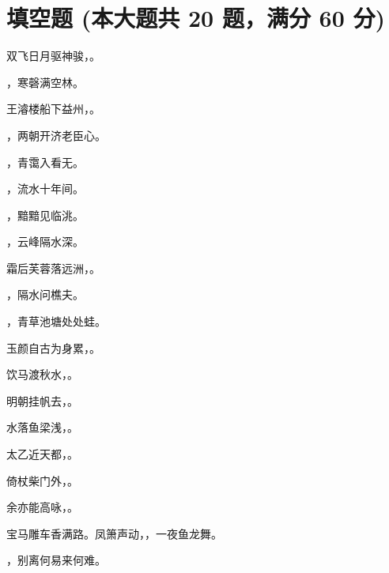 \documentclass[12pt, a4paper, addpoints, answers]{exam}
\begin{document}
\pagestyle{headandfoot}

\begin{center}
\end{center}
\vspace{5mm}

\normalsize
\vspace{5mm}

\section{\normalsize{填空题 (本大题共 20 题，满分 60 分)}}
\hspace{1.5cm}

\begin{questions}
\question[3] 双飞日月驱神骏，\fillin[半缺河山待女娲] 。

\question[3] \fillin[夕阳依旧垒] ，寒磬满空林。

\question[3] 王濬楼船下益州，\fillin[金陵王气黯然收] 。

\question[3] \fillin[三顾频烦天下计] ，两朝开济老臣心。

\question[3] \fillin[白云回望合] ，青霭入看无。

\question[3] \fillin[浮云一别后] ，流水十年间。

\question[3] \fillin[平沙日未没] ，黯黯见临洮。

\question[3] \fillin[野寺来人少] ，云峰隔水深。

\question[3] 霜后芙蓉落远洲，\fillin[雁行初过客登楼] 。

\question[3] \fillin[欲投人处宿] ，隔水问樵夫。

\question[3] \fillin[黄梅时节家家雨] ，青草池塘处处蛙。

\question[3] 玉颜自古为身累，\fillin[肉食何人与国谋] 。

\question[3] 饮马渡秋水，\fillin[水寒风似刀] 。

\question[3] 明朝挂帆去，\fillin[枫叶落纷纷] 。

\question[3] 水落鱼梁浅，\fillin[天寒梦泽深] 。

\question[3] 太乙近天都，\fillin[连山接海隅] 。

\question[3] 倚杖柴门外，\fillin[临风听暮蝉] 。

\question[3] 余亦能高咏，\fillin[斯人不可闻] 。

\question[3] 宝马雕车香满路。凤箫声动，\fillin[玉壶光转] ，一夜鱼龙舞。

\question[3] \fillin[岂有千山与万山] ，别离何易来何难。

\end{questions}
\end{document}
